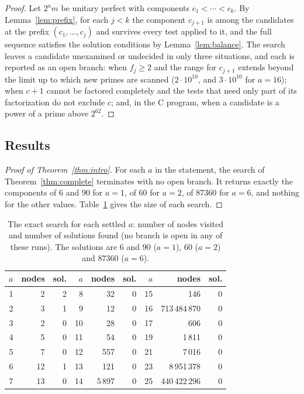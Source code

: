 \documentclass[11pt]{amsart}
\theoremstyle{plain}
\theoremstyle{definition}
\newcommand{\RESULTwallproof}{}
\begin{document}
\begin{proof}
Let $2^a m$ be unitary perfect with components $c_1<\cdots<c_k$.  By
Lemma~\ref{lem:prefix}, for each $j<k$ the component $c_{j+1}$ is among the
candidates at the prefix $(c_1,\dots,c_j)$ and survives every test applied to
it, and the full sequence satisfies the solution conditions by
Lemma~\ref{lem:balance}.  The search leaves a candidate unexamined or
undecided in only three situations, and each is reported as an open branch:
when $f_j\ge2$ and the range for $c_{j+1}$ extends beyond the limit up to
which new primes are scanned ($2\cdot10^{10}$, and $3\cdot10^{10}$ for
$a=16$); when $c+1$ cannot be factored completely and the tests that need
only part of its factorization do not exclude $c$; and, in the C program,
when a candidate is a power of a prime above $2^{62}$.
\end{proof}

\subsection{Results}

\begin{proof}[Proof of Theorem~\ref{thm:intro}]
For each $a$ in the statement, the search of Theorem~\ref{thm:complete}
terminates with no open branch.  It returns exactly the components of $6$ and
$90$ for $a=1$, of $60$ for $a=2$, of $87360$ for $a=6$\RESULTwallproof{}, and
nothing for the other values.  Table~\ref{tab:search} gives the size of each
search.
\end{proof}

\begin{table}[h]
\centering
\small
\begin{tabular}{rrr@{\qquad}rrr@{\qquad}rrr}
\toprule
$a$ & nodes & sol. & $a$ & nodes & sol. & $a$ & nodes & sol.\\
\midrule
1 & 2 & 2 & 8 & 32 & 0 & 15 & 146 & 0\\
2 & 3 & 1 & 9 & 12 & 0 & 16 & 713\,484\,870 & 0\\
3 & 2 & 0 & 10 & 28 & 0 & 17 & 606 & 0\\
4 & 5 & 0 & 11 & 54 & 0 & 19 & 1\,811 & 0\\
5 & 7 & 0 & 12 & 557 & 0 & 21 & 7\,016 & 0\\
6 & 12 & 1 & 13 & 121 & 0 & 23 & 8\,951\,378 & 0\\
7 & 13 & 0 & 14 & 5\,897 & 0 & 25 & 440\,422\,296 & 0\\
\bottomrule
\end{tabular}
\medskip
\caption{The exact search for each settled $a$: number of nodes visited and number of solutions found (no branch is open in any of these runs). The solutions are $6$ and $90$ ($a=1$), $60$ ($a=2$) and $87360$ ($a=6$).}
\label{tab:search}
\end{table}
\end{document}
